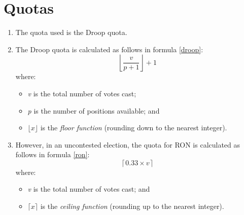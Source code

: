 \documentclass[12pt]{article}
\begin{document}
\section{Quotas}
\begin{enumerate}
    \item The quota used is the Droop quota.
    \item The Droop quota is calculated as follows in formula \ref{droop}:
    \begin{equation}\label{droop}
        \left\lfloor\frac{v}{p+1}\right\rfloor+1
    \end{equation}
    where:
    \begin{itemize}
        \item \textit{v} is the total number of votes cast;
        \item \textit{p} is the number of positions available; and
        \item \(\lfloor x\rfloor\) is the \emph{floor function} (rounding down to the nearest integer).
    \end{itemize}
    \item However, in an uncontested election, the quota for RON is calculated as follows in formula \ref{ron}:
    \begin{equation}\label{ron}
        \left\lceil0.33 \times v\right\rceil
    \end{equation}
    where:
    \begin{itemize}
        \item \textit{v} is the total number of votes cast; and
        \item \(\lceil x\rceil\) is the \emph{ceiling function} (rounding up to the nearest integer).
    \end{itemize}
\end{enumerate}
\end{document}

